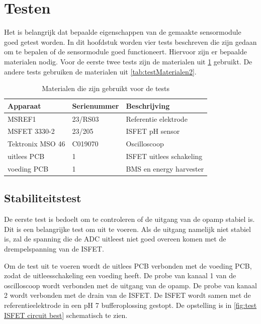 \section{Testen}

Het is belangrijk dat bepaalde eigenschappen van de gemaakte sensormodule goed getest worden. In dit hoofdstuk worden vier tests beschreven die zijn gedaan om te bepalen of de sensormodule goed functioneert. Hiervoor zijn er bepaalde materialen nodig. Voor de eerste twee tests zijn de materialen uit \cref{tab:testMaterialen} gebruikt. De andere tests gebruiken de materialen uit \cref{tab:testMaterialen2}.

\begin{table}[ht]
    \centering
    \begin{tabular}{l|l|l}
        Apparaat         & Serienummer & Beschrijving \\
        \hline
        MSREF1           & 23/RS03     & Referentie elektrode       \\
        MSFET 3330-2     & 23/205      & ISFET pH sensor            \\
        Tektronix MSO 46 & C019070     & Oscilloscoop               \\
        uitlees PCB      & 1           & ISFET uitlees schakeling   \\
        voeding PCB      & 1           & BMS en energy harvester    \\    
        \hline
    \end{tabular}
    \caption{Materialen die zijn gebruikt voor de tests}
    \label{tab:testMaterialen}
\end{table}

\subsection{Stabiliteitstest}
De eerste test is bedoelt om te controleren of de uitgang van de opamp stabiel is. Dit is een belangrijke test om uit te voeren. Als de uitgang namelijk niet stabiel is, zal de spanning die de ADC uitleest niet goed overeen komen met de drempelspanning van de ISFET.

Om de test uit te voeren wordt de uitlees PCB verbonden met de voeding PCB, zodat de uitleesschakeling een voeding heeft. De probe van kanaal 1 van de oscilloscoop wordt verbonden met de uitgang van de opamp. De probe van kanaal 2 wordt verbonden met de drain van de ISFET. De ISFET wordt samen met de referentieelektrode in een pH 7 bufferoplossing gestopt. De opstelling is in \cref{fig:test ISFET circuit best} schematisch te zien.

